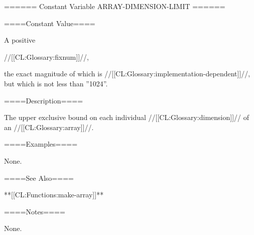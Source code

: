 ====== Constant Variable ARRAY-DIMENSION-LIMIT ======

====Constant Value====

A positive

//[[CL:Glossary:fixnum]]//,

the exact magnitude of which is //[[CL:Glossary:implementation-dependent]]//, but which is not less than ''1024''.

====Description====

The upper exclusive bound on each individual //[[CL:Glossary:dimension]]// of an //[[CL:Glossary:array]]//.

====Examples====

None.

====See Also====

**[[CL:Functions:make-array]]**

====Notes====

None.

